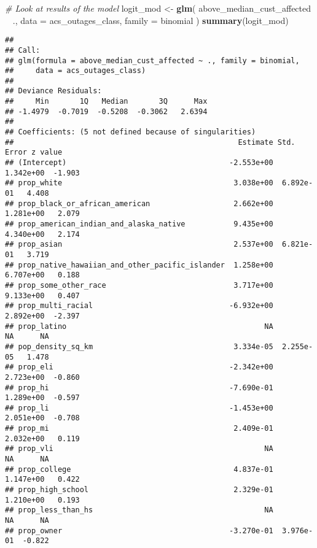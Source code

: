 \documentclass[
]{article}
\newenvironment{Shaded}{\begin{snugshade}}{\end{snugshade}}
\newcommand{\CommentTok}[1]{\textcolor[rgb]{0.56,0.35,0.01}{\textit{#1}}}
\newcommand{\DataTypeTok}[1]{\textcolor[rgb]{0.13,0.29,0.53}{#1}}
\newcommand{\KeywordTok}[1]{\textcolor[rgb]{0.13,0.29,0.53}{\textbf{#1}}}
\newcommand{\NormalTok}[1]{#1}
\newcommand{\OperatorTok}[1]{\textcolor[rgb]{0.81,0.36,0.00}{\textbf{#1}}}
\newcommand{\StringTok}[1]{\textcolor[rgb]{0.31,0.60,0.02}{#1}}
\begin{document}
\begin{Shaded}
\begin{Highlighting}[]
\CommentTok{# Look at results of the model}
\NormalTok{logit_mod <-}
\StringTok{  }\KeywordTok{glm}\NormalTok{(}
\NormalTok{    above_median_cust_affected }\OperatorTok{~}\StringTok{ }\NormalTok{.,}
    \DataTypeTok{data =}\NormalTok{ acs_outages_class, }
    \DataTypeTok{family =}\NormalTok{ binomial}
\NormalTok{  )}
\KeywordTok{summary}\NormalTok{(logit_mod)}
\end{Highlighting}
\end{Shaded}

\begin{verbatim}
## 
## Call:
## glm(formula = above_median_cust_affected ~ ., family = binomial, 
##     data = acs_outages_class)
## 
## Deviance Residuals: 
##     Min       1Q   Median       3Q      Max  
## -1.4979  -0.7019  -0.5208  -0.3062   2.6394  
## 
## Coefficients: (5 not defined because of singularities)
##                                                   Estimate Std. Error z value
## (Intercept)                                     -2.553e+00  1.342e+00  -1.903
## prop_white                                       3.038e+00  6.892e-01   4.408
## prop_black_or_african_american                   2.662e+00  1.281e+00   2.079
## prop_american_indian_and_alaska_native           9.435e+00  4.340e+00   2.174
## prop_asian                                       2.537e+00  6.821e-01   3.719
## prop_native_hawaiian_and_other_pacific_islander  1.258e+00  6.707e+00   0.188
## prop_some_other_race                             3.717e+00  9.133e+00   0.407
## prop_multi_racial                               -6.932e+00  2.892e+00  -2.397
## prop_latino                                             NA         NA      NA
## pop_density_sq_km                                3.334e-05  2.255e-05   1.478
## prop_eli                                        -2.342e+00  2.723e+00  -0.860
## prop_hi                                         -7.690e-01  1.289e+00  -0.597
## prop_li                                         -1.453e+00  2.051e+00  -0.708
## prop_mi                                          2.409e-01  2.032e+00   0.119
## prop_vli                                                NA         NA      NA
## prop_college                                     4.837e-01  1.147e+00   0.422
## prop_high_school                                 2.329e-01  1.210e+00   0.193
## prop_less_than_hs                                       NA         NA      NA
## prop_owner                                      -3.270e-01  3.976e-01  -0.822

\end{verbatim}
\end{document}
